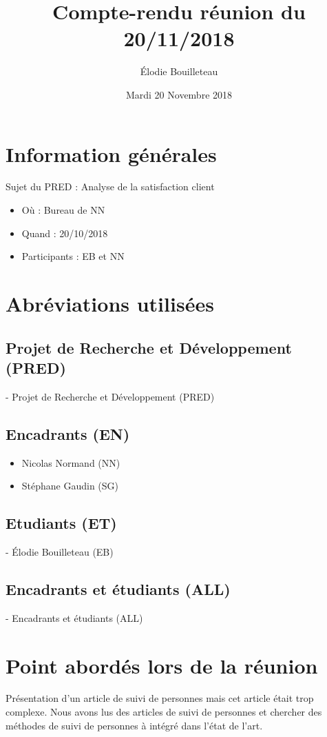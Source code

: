 \documentclass[11pt]{report}
\title{Compte-rendu réunion du 20/11/2018}
\author{Élodie Bouilleteau}
\date{Mardi 20 Novembre 2018}
\begin{document}
\maketitle
\renewcommand{\thesection}{\arabic{section}} 
\section{Information générales}
Sujet du PRED : Analyse de la satisfaction client
\\
	\begin{itemize}
		\item Où : Bureau de NN
		\item Quand : 20/10/2018
		\item Participants : EB et NN
	\end{itemize}

\section{Abréviations utilisées}

\subsection{Projet de Recherche et Développement (PRED)}
- Projet de Recherche et Développement (PRED)

\subsection{Encadrants (EN)}
 	\begin{itemize}
		\item Nicolas Normand (NN)
		\item Stéphane Gaudin (SG)
	\end{itemize}
    
\subsection{Etudiants (ET)}
- Élodie Bouilleteau (EB)

\subsection{Encadrants et étudiants (ALL)}
- Encadrants et étudiants (ALL)

\newpage

\section{Point abordés lors de la réunion}
Présentation d'un article de suivi de personnes mais cet article était trop complexe. Nous avons lus des articles de suivi de personnes et chercher des méthodes de suivi de personnes à intégré dans l'état de l'art.
\end{document}
